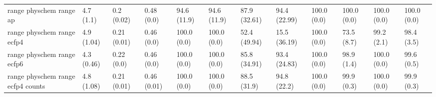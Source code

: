 \begin{tabular}{llllllllllll}
range physchem range ap & {\cellcolor[HTML]{F0F9FB}} \color[HTML]{000000} 4.7 (1.1) & {\cellcolor[HTML]{E7F6F9}} \color[HTML]{000000} 0.2 (0.02) & {\cellcolor[HTML]{6FC6AA}} \color[HTML]{000000} 0.48 (0.0) & {\cellcolor[HTML]{F7FCFD}} \color[HTML]{000000} 94.6 (11.9) & {\cellcolor[HTML]{F7FCFD}} \color[HTML]{000000} 94.6 (11.9) & {\cellcolor[HTML]{006B2B}} \color[HTML]{F1F1F1} 87.9 (32.61) & {\cellcolor[HTML]{005622}} \color[HTML]{F1F1F1} 94.4 (22.99) & {\cellcolor[HTML]{00441B}} \color[HTML]{F1F1F1} 100.0 (0.0) & {\cellcolor[HTML]{00441B}} \color[HTML]{F1F1F1} 100.0 (0.0) & {\cellcolor[HTML]{00441B}} \color[HTML]{F1F1F1} 100.0 (0.0) & {\cellcolor[HTML]{004A1E}} \color[HTML]{F1F1F1} 100.0 (0.0) \\
range physchem range ecfp4 & {\cellcolor[HTML]{F0F9FB}} \color[HTML]{000000} 4.9 (1.04) & {\cellcolor[HTML]{E0F3F5}} \color[HTML]{000000} 0.21 (0.01) & {\cellcolor[HTML]{75C9AF}} \color[HTML]{000000} 0.46 (0.0) & {\cellcolor[HTML]{F7FCFD}} \color[HTML]{000000} 100.0 (0.0) & {\cellcolor[HTML]{F7FCFD}} \color[HTML]{000000} 100.0 (0.0) & {\cellcolor[HTML]{5EBE9B}} \color[HTML]{000000} 52.4 (49.94) & {\cellcolor[HTML]{DFF3F5}} \color[HTML]{000000} 15.5 (36.19) & {\cellcolor[HTML]{00441B}} \color[HTML]{F1F1F1} 100.0 (0.0) & {\cellcolor[HTML]{00441B}} \color[HTML]{F1F1F1} 73.5 (8.7) & {\cellcolor[HTML]{00441B}} \color[HTML]{F1F1F1} 99.2 (2.1) & {\cellcolor[HTML]{00441B}} \color[HTML]{F1F1F1} 98.4 (3.5) \\
range physchem range ecfp6 & {\cellcolor[HTML]{F1FAFC}} \color[HTML]{000000} 4.3 (0.46) & {\cellcolor[HTML]{E1F4F6}} \color[HTML]{000000} 0.22 (0.0) & {\cellcolor[HTML]{77C9B0}} \color[HTML]{000000} 0.46 (0.0) & {\cellcolor[HTML]{F7FCFD}} \color[HTML]{000000} 100.0 (0.0) & {\cellcolor[HTML]{F7FCFD}} \color[HTML]{000000} 100.0 (0.0) & {\cellcolor[HTML]{05712F}} \color[HTML]{F1F1F1} 85.8 (34.91) & {\cellcolor[HTML]{005924}} \color[HTML]{F1F1F1} 93.4 (24.83) & {\cellcolor[HTML]{00441B}} \color[HTML]{F1F1F1} 100.0 (0.0) & {\cellcolor[HTML]{00441B}} \color[HTML]{F1F1F1} 98.9 (1.4) & {\cellcolor[HTML]{00441B}} \color[HTML]{F1F1F1} 100.0 (0.0) & {\cellcolor[HTML]{00441B}} \color[HTML]{F1F1F1} 99.6 (0.5) \\
range physchem range ecfp4 counts & {\cellcolor[HTML]{F0F9FB}} \color[HTML]{000000} 4.8 (1.08) & {\cellcolor[HTML]{E3F4F8}} \color[HTML]{000000} 0.21 (0.01) & {\cellcolor[HTML]{75C9AF}} \color[HTML]{000000} 0.46 (0.01) & {\cellcolor[HTML]{F7FCFD}} \color[HTML]{000000} 100.0 (0.0) & {\cellcolor[HTML]{F7FCFD}} \color[HTML]{000000} 100.0 (0.0) & {\cellcolor[HTML]{00692A}} \color[HTML]{F1F1F1} 88.5 (31.9) & {\cellcolor[HTML]{005522}} \color[HTML]{F1F1F1} 94.8 (22.2) & {\cellcolor[HTML]{00441B}} \color[HTML]{F1F1F1} 100.0 (0.0) & {\cellcolor[HTML]{00441B}} \color[HTML]{F1F1F1} 99.9 (0.3) & {\cellcolor[HTML]{00441B}} \color[HTML]{F1F1F1} 100.0 (0.0) & {\cellcolor[HTML]{00441B}} \color[HTML]{F1F1F1} 99.9 (0.3) \\

\end{tabular}

